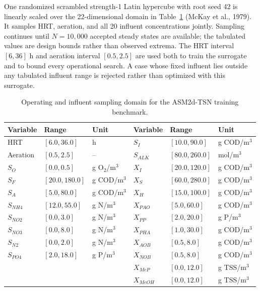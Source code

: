\documentclass[a4paper,fleqn]{cas-sc}
\begin{document}
One randomized scrambled strength-1 Latin hypercube with root seed 42 is linearly scaled over the 22-dimensional domain in Table~\ref{tab:simulation_domain} (McKay et al., 1979). It samples HRT, aeration, and all 20 influent concentrations jointly. Sampling continues until $N=10{,}000$ accepted steady states are available; the tabulated values are design bounds rather than observed extrema. The HRT interval $[6,36]$ h and aeration interval $[0.5,2.5]$ are used both to train the surrogate and to bound every operational search. A case whose fixed influent lies outside any tabulated influent range is rejected rather than optimized with this surrogate.

\begin{table}[htbp]
\centering
\caption{Operating and influent sampling domain for the ASM2d-TSN training benchmark.}
\label{tab:simulation_domain}
\scriptsize
\setlength{\tabcolsep}{3pt}
\begin{tabular}{lll|lll}
\toprule
Variable & Range & Unit & Variable & Range & Unit \\
\midrule
HRT & $[6.0,36.0]$ & h & $S_I$ & $[10.0,90.0]$ & g COD/m$^3$ \\
Aeration & $[0.5,2.5]$ & -- & $S_{ALK}$ & $[80.0,260.0]$ & mol/m$^3$ \\
$S_O$ & $[0.0,0.5]$ & g O$_2$/m$^3$ & $X_I$ & $[20.0,120.0]$ & g COD/m$^3$ \\
$S_F$ & $[20.0,180.0]$ & g COD/m$^3$ & $X_S$ & $[60.0,280.0]$ & g COD/m$^3$ \\
$S_A$ & $[5.0,80.0]$ & g COD/m$^3$ & $X_H$ & $[15.0,100.0]$ & g COD/m$^3$ \\
$S_{NH4}$ & $[12.0,55.0]$ & g N/m$^3$ & $X_{PAO}$ & $[5.0,60.0]$ & g COD/m$^3$ \\
$S_{NO2}$ & $[0.0,3.0]$ & g N/m$^3$ & $X_{PP}$ & $[2.0,20.0]$ & g P/m$^3$ \\
$S_{NO3}$ & $[0.0,8.0]$ & g N/m$^3$ & $X_{PHA}$ & $[1.0,30.0]$ & g COD/m$^3$ \\
$S_{N2}$ & $[0.0,2.0]$ & g N/m$^3$ & $X_{AOB}$ & $[0.5,8.0]$ & g COD/m$^3$ \\
$S_{PO4}$ & $[2.0,18.0]$ & g P/m$^3$ & $X_{NOB}$ & $[0.5,8.0]$ & g COD/m$^3$ \\
 & & & $X_{MeP}$ & $[0.0,12.0]$ & g TSS/m$^3$ \\
 & & & $X_{MeOH}$ & $[0.0,12.0]$ & g TSS/m$^3$ \\
\bottomrule
\end{tabular}
\end{table}
\end{document}
